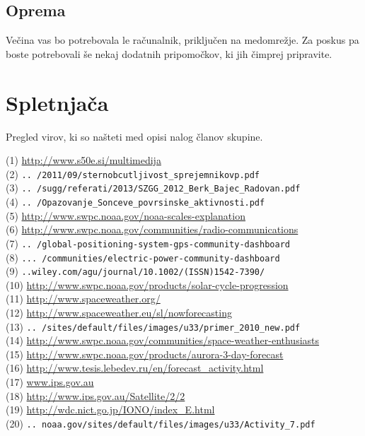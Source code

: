 \subsection{Oprema}
\label{subsec:VesVrem_Oprema}
Večina vas bo potrebovala le računalnik, priključen na medomrežje. Za poskus pa boste potrebovali še nekaj dodatnih pripomočkov, ki jih čimprej pripravite.

\section{Spletnjača}
\label{sec:VesVrem_Splet}

Pregled virov, ki so našteti med opisi nalog članov skupine.

(1)   \url{http://www.s50e.si/multimedija}\\[2mm]
(2)   \verb|.. /2011/09/sternobcutljivost_sprejemnikovp.pdf| \\
(3)   \verb|.. /sugg/referati/2013/SZGG_2012_Berk_Bajec_Radovan.pdf| \\
(4)   \verb|.. /Opazovanje_Sonceve_povrsinske_aktivnosti.pdf| \\
(5)   \url{http://www.swpc.noaa.gov/noaa-scales-explanation}\\[2mm]   
(6)   \url{http://www.swpc.noaa.gov/communities/radio-communications}\\[2mm]   
(7)   \verb|.. /global-positioning-system-gps-community-dashboard| \\   
(8)   \verb|... /communities/electric-power-community-dashboard|  \\ 
(9)   \verb|..wiley.com/agu/journal/10.1002/(ISSN)1542-7390/ |  \\   
(10)  \url{http://www.swpc.noaa.gov/products/solar-cycle-progression}\\[2mm]   
(11)  \url{http://www.spaceweather.org/}\\[2mm]   
(12)  \url{http://www.spaceweather.eu/sl/nowforecasting}\\[2mm]   
(13)  \verb|.. /sites/default/files/images/u33/primer_2010_new.pdf|  \\   
(14)  \url{http://www.swpc.noaa.gov/communities/space-weather-enthusiasts}\\[2mm]  
(15)  \url{http://www.swpc.noaa.gov/products/aurora-3-day-forecast}\\[2mm]   
(16)  \url{http://www.tesis.lebedev.ru/en/forecast_activity.html}\\[2mm]   
(17)  \url{www.ips.gov.au}\\[2mm]   
(18)  \url{http://www.ips.gov.au/Satellite/2/2}\\[2mm]   
(19)  \url{http://wdc.nict.go.jp/IONO/index_E.html}\\[2mm]   
(20)  \verb|.. noaa.gov/sites/default/files/images/u33/Activity_7.pdf|

